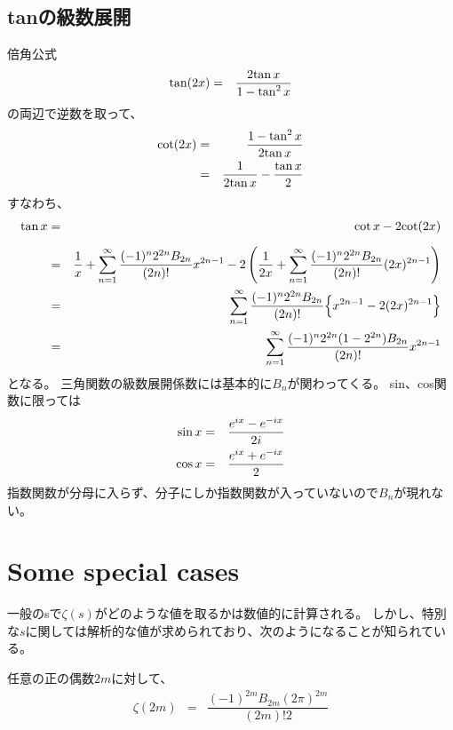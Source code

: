 \documentclass[uplatex,a4j,12pt,dvipdfmx]{jsarticle}
\begin{document}
\subsection{tanの級数展開}

倍角公式
\begin{eqnarray}
	{\rm tan} (2x)
	&=&
	\dfrac{ 2 {\rm tan} \ \! x }{ 1 - {\rm tan}^{2} \ \! x }
\end{eqnarray}
の両辺で逆数を取って、
\begin{eqnarray}
	{\rm cot} (2x)
	&=&
	\dfrac{ 1 - {\rm tan}^{2} \ \! x }{2 {\rm tan} \ \! x }
	\nonumber \\ &=&
	\dfrac{1}{2 {\rm tan} \ \! x }
	-
	\dfrac{{\rm tan} \ \! x}{2}
\end{eqnarray}
すなわち、
\begin{eqnarray}
	{\rm tan} \ \! x
	&=&
	{ \rm cot } \ \! x
	-
	2 { \rm cot } (2x)
	\nonumber \\[2mm] &=&
	\dfrac{1}{x}
	+
	\sum_{n=1}^{\infty}
	\dfrac{(-1)^{n} 2^{2n} B_{2n} }{(2n)!}
	x^{2n-1}
	-
	2
	\left(
	\dfrac{1}{2x}
	+
	\sum_{n=1}^{\infty}
	\dfrac{(-1)^{n} 2^{2n} B_{2n} }{(2n)!}
		(2x)^{2n-1}
	\right)
	\nonumber \\ &=&
	\sum_{n=1}^{\infty}
	\dfrac{(-1)^{n} 2^{2n} B_{2n} }{(2n)!}
	\Big\{
	x^{2n-1}
	-
	2
	(2x)^{2n-1}
	\Big\}
	\nonumber \\ &=&
	\sum_{n=1}^{\infty}
	\dfrac{(-1)^{n} 2^{2n} ( 1 - 2^{2n} ) B_{2n} }{(2n)!}
	x^{2n-1}
\end{eqnarray}
となる。
三角関数の級数展開係数には基本的に$B_{n}$が関わってくる。
sin、cos関数に限っては
\begin{eqnarray}
	{\rm sin} \ \! x
	&=&
	\dfrac{e^{ix} - e^{-ix}}{2i}
	\\
	{\rm cos} \ \! x
	&=&
	\dfrac{e^{ix} + e^{-ix}}{2}
\end{eqnarray}
指数関数が分母に入らず、分子にしか指数関数が入っていないので$B_{n}$が現れない。




\section{Some special cases}

一般のsで$\zeta(s)$がどのような値を取るかは数値的に計算される。
しかし、特別な$s$に関しては解析的な値が求められており、次のようになることが知られている。

任意の正の偶数$2m$に対して、
\begin{eqnarray}
	\zeta(2m)
	&=&
	\dfrac{(-1)^{2m} B_{2m} (2 \pi)^{2m} }{(2m)! 2}
\end{eqnarray}
\end{document}
